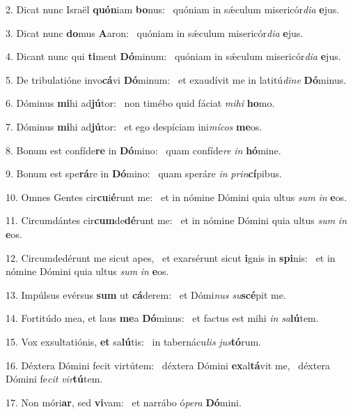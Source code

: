 2. Dicat nunc Israël \textbf{quón}iam \textbf{bo}nus: \ast\  quóniam in sǽculum misericór\textit{di}\textit{a} \textbf{e}jus.\

3. Dicat nunc \textbf{do}mus \textbf{A}aron: \ast\  quóniam in sǽculum misericór\textit{di}\textit{a} \textbf{e}jus.\

4. Dicant nunc qui \textbf{ti}ment \textbf{Dó}minum: \ast\  quóniam in sǽculum misericór\textit{di}\textit{a} \textbf{e}jus.\

5. De tribulatióne invo\textbf{cá}vi \textbf{Dó}minum: \ast\  et exaudívit me in latitú\textit{di}\textit{ne} \textbf{Dó}minus.\

6. Dóminus \textbf{mi}hi ad\textbf{jú}tor: \ast\  non timébo quid fáciat \textit{mi}\textit{hi} \textbf{ho}mo.\

7. Dóminus \textbf{mi}hi ad\textbf{jú}tor: \ast\  et ego despíciam ini\textit{mí}\textit{cos} \textbf{me}os.\

8. Bonum est confíde\textbf{re} in \textbf{Dó}mino: \ast\  quam confíde\textit{re} \textit{in} \textbf{hó}mine.\

9. Bonum est spe\textbf{rá}re in \textbf{Dó}mino: \ast\  quam speráre \textit{in} \textit{prin}\textbf{cí}pibus.\

10. Omnes Gentes cir\textbf{cu}i\textbf{é}runt me: \ast\  et in nómine Dómini quia ultus \textit{sum} \textit{in} \textbf{e}os.\

11. Circumdántes cir\textbf{cum}de\textbf{dé}runt me: \ast\  et in nómine Dómini quia ultus \textit{sum} \textit{in} \textbf{e}os.\

12. Circumdedérunt me sicut apes, \dag\  et exarsérunt sicut \textbf{i}gnis in \textbf{spi}nis: \ast\  et in nómine Dómini quia ultus \textit{sum} \textit{in} \textbf{e}os.\

13. Impúlsus evérsus \textbf{sum} ut \textbf{cá}derem: \ast\  et Dómi\textit{nus} \textit{su}\textbf{scé}pit me.\

14. Fortitúdo mea, et laus \textbf{me}a \textbf{Dó}minus: \ast\  et factus est mihi \textit{in} \textit{sa}\textbf{lú}tem.\

15. Vox exsultatiónis, \textbf{et} sa\textbf{lú}tis: \ast\  in tabernácu\textit{lis} \textit{jus}\textbf{tó}rum.\

16. Déxtera Dómini fecit virtútem: \dag\  déxtera Dómini \textbf{ex}al\textbf{tá}vit me, \ast\  déxtera Dómini fe\textit{cit} \textit{vir}\textbf{tú}tem.\

17. Non móri\textbf{ar}, sed \textbf{vi}vam: \ast\  et narrábo ó\textit{pe}\textit{ra} \textbf{Dó}mini.\


